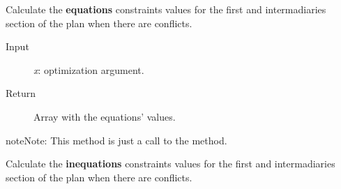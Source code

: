 \documentclass[letterpaper,10pt,english]{sphinxmanual}
\begin{document}
\begin{fulllineitems}

\begin{fulllineitems}
\label{Multi-robot motion planner:planning_sim.Robot._co_feqcons}
Calculate the \textbf{equations} constraints values for the first and intermadiaries
section of the plan when there are conflicts.
\begin{description}
\item[{Input}] \leavevmode
\emph{x}: optimization argument.

\item[{Return}] \leavevmode
Array with the equations' values.

\end{description}

\begin{notice}{note}{Note:}
This method is just a call to the {\hyperref[Multi-robot motion planner:planning_sim.Robot._sa_feqcons]{}} method.
\end{notice}

\end{fulllineitems}


\begin{fulllineitems}
\label{Multi-robot motion planner:planning_sim.Robot._co_fieqcons}
Calculate the \textbf{inequations} constraints values for the first and intermadiaries
section of the plan when there are conflicts.


\end{fulllineitems}
\end{fulllineitems}
\end{document}
